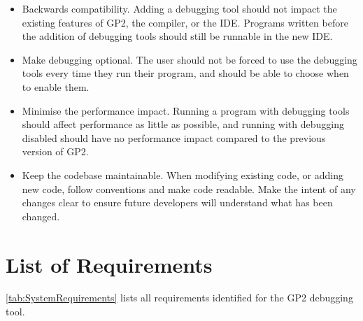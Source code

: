 \documentclass[authoryearcitations]{UoYCSproject}
\begin{document}
\begin{itemize}
    \item Backwards compatibility. Adding a debugging tool should not impact the
          existing features of GP2, the compiler, or the IDE. Programs written
          before the addition of debugging tools should still be runnable in the
          new IDE.

    \item Make debugging optional. The user should not be forced to use the
          debugging tools every time they run their program, and should be able
          to choose when to enable them.

    \item Minimise the performance impact. Running a program with debugging tools
          should affect performance as little as possible, and running with
          debugging disabled should have no performance impact compared to the
          previous version of GP2.

    \item Keep the codebase maintainable. When modifying existing code, or adding
          new code, follow conventions and make code readable. Make the intent
          of any changes clear to ensure future developers will understand what
          has been changed.
\end{itemize}


\section{List of Requirements}
\label{sec:ListOfRequirements}

\autoref{tab:SystemRequirements} lists all requirements identified for the GP2
debugging tool.
\end{document}
